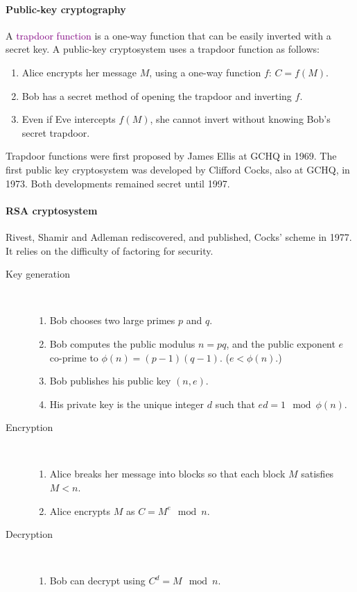 \documentclass[a4paper, 11pt, openany]{book}
\numberwithin{equation}{section}
\theoremstyle{plain}
\theoremstyle{definition}
\newcommand{\Define}[1]{\textcolor{purple}{#1}}
\begin{document}
\paragraph{Public-key cryptography}
A \Define{trapdoor function} is a one-way function that can be easily inverted with a secret key. A public-key cryptosystem uses a trapdoor function as follows:
\begin{enumerate}
    \item Alice encrypts her message $M$, using a one-way function $f$: $C = f(M)$.

    \item Bob has a secret method of opening the trapdoor and inverting $f$.

    \item Even if Eve intercepts $f(M)$, she cannot invert without knowing Bob's secret trapdoor.
\end{enumerate}
Trapdoor functions were first proposed by James Ellis at GCHQ in 1969. The first public key cryptosystem was developed by Clifford Cocks, also at GCHQ, in 1973. Both developments remained secret until 1997.



\paragraph{RSA cryptosystem}
Rivest, Shamir and Adleman rediscovered, and published, Cocks' scheme in 1977. 
It relies on the difficulty of factoring for security.

\begin{description}
\item[Key generation]~
\begin{enumerate}
    \item Bob chooses two large primes $p$ and $q$.

    \item Bob computes the public modulus $n = pq$, and the public exponent $e$ co-prime to $\phi(n) = (p-1)(q-1)$. ($e< \phi(n)$.)

    \item Bob publishes his public key $(n,e)$.
    
    \item His private key is the unique integer $d$ such that $ed = 1 \mod \phi(n)$.
\end{enumerate}

\item [Encryption]~
\begin{enumerate}
    \item Alice breaks her message into blocks so that each block $M$ satisfies $M<n$.

    \item Alice encrypts $M$ as $C = M^e \mod n$.
\end{enumerate}

\item[Decryption]~
\begin{enumerate}
    \item Bob can decrypt using $C^d = M \mod n$.
\end{enumerate}
\end{description}
\end{document}
